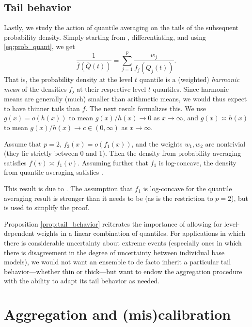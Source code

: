 \documentclass{article}
\begin{document}
\subsection{Tail behavior}

Lastly, we study the action of quantile averaging on the tails of the subsequent
probability density. Simply starting from , differentiating, and using \eqref{eq:prob_quant}, we get
\[
\frac{1}{\bar{f}(\bar{Q}(t))} = \sum_{j=1}^p \frac{w_j}{f_j(Q_j(t))}. 
\]
That is, the probability density  at the level $t$ quantile is
a (weighted) \emph{harmonic mean} of the densities $f_j$ at their respective
level $t$ quantiles. Since harmonic means are generally (much) smaller than
arithmetic means, we would thus expect  to have thinner tails
than $f$. The next result formalizes this. We use $g(x) = o(h(x))$ to mean
$g(x)/h(x) \to 0$ as $x \to \infty$, and $g(x) \asymp h(x)$ to mean $g(x)/h(x)
\to c \in (0, \infty)$ as $x \to \infty$.

\begin{proposition}
\label{prop:tail_behavior}
Assume that $p=2$, $f_2(x) = o(f_1(x))$, and the weights $w_1,w_2$ are
nontrivial (they lie strictly between 0 and 1). Then the density from
probability averaging satisfies $f(v) \asymp f_1(v)$. Assuming further that
$f_1$ is log-concave, the density from quantile averaging satisfies
.  
\end{proposition}

This result is due to \citet{fakoor2021flexible}. The assumption that $f_1$ is
log-concave for the quantile averaging result is stronger than it needs to be
(as is the restriction to $p=2$), but is used to simplify the proof. 

Proposition \ref{prop:tail_behavior} reiterates the importance of allowing for
level-dependent weights in a linear combination of quantiles. For applications
in which there is considerable uncertainty about extreme events (especially ones
in which there is disagreement in the degree of uncertainty between individual
base models), we would not want an ensemble to de facto inherit a particular
tail behavior---whether thin or thick---but want to endow the aggregation
procedure with the ability to adapt its tail behavior as needed.

\section{Aggregation and (mis)calibration}
\label{sec:aggr_calib}



\end{document}
